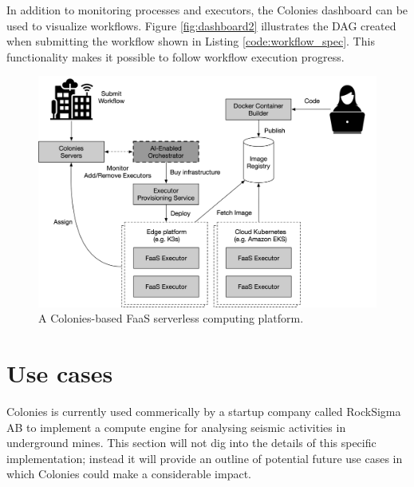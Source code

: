 \documentclass{article}
\begin{document}

In addition to monitoring processes and executors, the Colonies dashboard can be used to visualize workflows. Figure \ref{fig:dashboard2} illustrates the DAG created when submitting the workflow shown in Listing \ref{code:workflow_spec}. This functionality makes it possible to follow workflow execution progress.

\begin{figure}[h]
	\centering
    \includegraphics[scale=0.44]{cognite_faas.png}
	\caption{A Colonies-based FaaS serverless computing platform.}
	\label{fig:faas}
\end{figure}

\section{Use cases}
Colonies is currently used commerically by a startup company called RockSigma AB\cite{https://www.rocksigma.com} to implement a compute engine for analysing seismic activities in underground mines. This section will not dig into the details of this specific implementation; instead it will provide an outline of potential future use cases in which Colonies could make a considerable impact.
\end{document}

